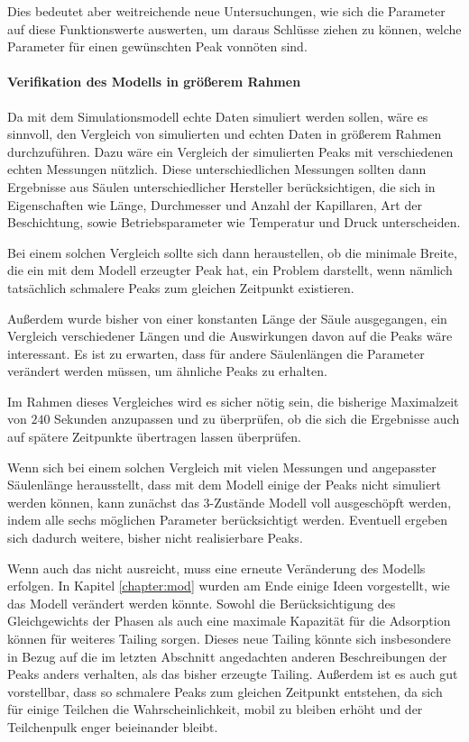 Dies bedeutet aber weitreichende neue Untersuchungen, wie sich die Parameter auf diese Funktionswerte auswerten, um daraus Schlüsse ziehen zu können, welche Parameter für einen gewünschten Peak vonnöten sind.



\paragraph{Verifikation des Modells in größerem Rahmen}
Da mit dem Simulationsmodell echte Daten simuliert werden sollen, wäre es sinnvoll, den Vergleich von simulierten und echten Daten in größerem Rahmen durchzuführen. Dazu wäre ein Vergleich der simulierten Peaks mit verschiedenen echten Messungen nützlich. Diese unterschiedlichen Messungen sollten dann Ergebnisse aus Säulen unterschiedlicher Hersteller berücksichtigen, die sich in Eigenschaften wie Länge, Durchmesser und Anzahl der Kapillaren, Art der Beschichtung, sowie Betriebsparameter wie Temperatur und Druck unterscheiden. 

Bei einem solchen Vergleich sollte sich dann heraustellen, ob die minimale Breite, die ein mit dem Modell erzeugter Peak hat, ein Problem darstellt, wenn nämlich tatsächlich schmalere Peaks zum gleichen Zeitpunkt existieren. 

Außerdem wurde bisher von einer konstanten Länge der Säule ausgegangen, ein Vergleich verschiedener Längen und die Auswirkungen davon auf die Peaks wäre interessant. Es ist zu erwarten, dass für andere Säulenlängen die Parameter verändert werden müssen, um ähnliche Peaks zu erhalten.

Im Rahmen dieses Vergleiches wird es sicher nötig sein, die bisherige Maximalzeit von $240$ Sekunden anzupassen und zu überprüfen, ob die sich die Ergebnisse auch auf spätere Zeitpunkte übertragen lassen überprüfen. 

Wenn sich bei einem solchen Vergleich mit vielen Messungen und angepasster Säulenlänge herausstellt, dass mit dem Modell einige der Peaks nicht simuliert werden können, kann zunächst das 3-Zustände Modell voll ausgeschöpft werden, indem alle sechs möglichen Parameter berücksichtigt werden. Eventuell ergeben sich dadurch weitere, bisher nicht realisierbare Peaks.

Wenn auch das nicht ausreicht, muss eine erneute Veränderung des Modells erfolgen.
In Kapitel \ref{chapter:mod} wurden am Ende einige Ideen vorgestellt, wie das Modell verändert werden könnte.
Sowohl die Berücksichtigung des Gleichgewichts der Phasen als auch eine maximale Kapazität für die Adsorption können für weiteres Tailing sorgen. Dieses neue Tailing könnte sich insbesondere in Bezug auf die im letzten Abschnitt angedachten anderen Beschreibungen der Peaks anders verhalten, als das bisher erzeugte Tailing. 
Außerdem ist es auch gut vorstellbar, dass so schmalere Peaks zum gleichen Zeitpunkt entstehen, da sich für einige Teilchen die Wahrscheinlichkeit, mobil zu bleiben erhöht und der Teilchenpulk enger beieinander bleibt.


